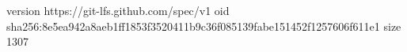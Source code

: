 version https://git-lfs.github.com/spec/v1
oid sha256:8e5ea942a8aeb1ff1853f3520411b9c36f085139fabe151452f1257606f611e1
size 1307
